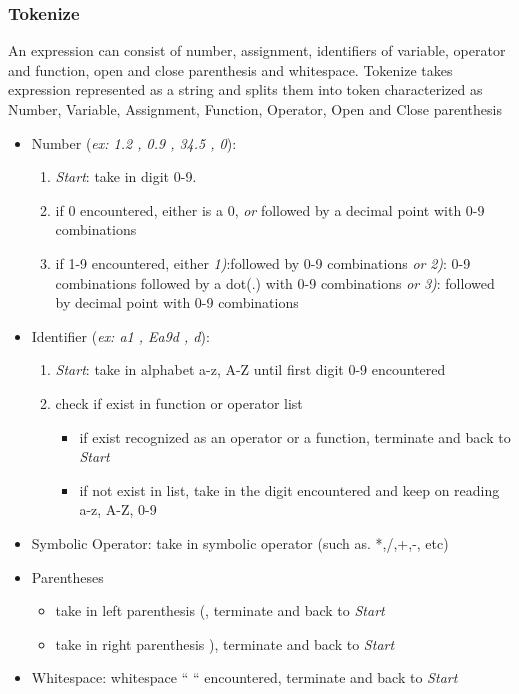 \documentclass[12pt,a4paper]{article}
\begin{document}
\subsubsection{Tokenize}
\textnormal{An expression can consist of number, assignment, identifiers of variable, operator and function, open and close parenthesis and whitespace. Tokenize takes expression represented as a string and splits them into token characterized as Number, Variable, Assignment, Function, Operator, Open and Close parenthesis}
\begin{itemize}
\item Number (\textit{ex: 1.2 , 0.9 , 34.5 , 0}):
\begin {enumerate}
\item \emph{Start}: take in digit 0-9.
\item if 0 encountered, either is a 0, \emph{or} followed by a decimal point with 0-9 combinations
\item if 1-9 encountered, either \emph{1)}:followed by 0-9 combinations \emph{or} \emph{2)}: 0-9 combinations followed by a dot(.) with 0-9 combinations \emph{or} \emph{3)}: followed by decimal point with 0-9 combinations
\end{enumerate}
\item Identifier (\textit{ex: a1 , Ea9d , d}):
\begin {enumerate}
\item \emph{Start}: take in alphabet a-z, A-Z until first digit 0-9 encountered
\item check if exist in function or operator list
\begin {itemize}
\item if exist recognized as an operator or a function, terminate and back to \emph{Start}
\item if not exist in list, take in the digit encountered and keep on reading a-z, A-Z, 0-9
\end{itemize}
\end{enumerate}
\item Symbolic Operator: take in symbolic operator (such as. *,/,+,-, etc)
\item Parentheses
\begin{itemize}
\item take in left parenthesis (, terminate and back to \emph{Start}
\item take in right parenthesis ), terminate and back to \emph{Start}
\end{itemize}
\item Whitespace: whitespace “ “ encountered, terminate and back to \emph{Start}
  
\end{itemize}
\newpage
\end{document}
